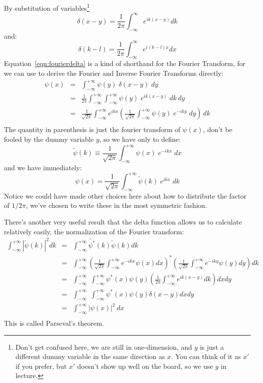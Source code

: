 \documentclass[12pt]{book}
\begin{document}
By substitution of variables\footnote{Don't get confused here, we are still in one-dimension, and $y$ is just a different dummy variable in the same direction as $x$.  You can think of it as $x'$ if you prefer, but $x'$ doesn't show up well on the board, so we use $y$ in lecture.}
$$
\delta(x-y) = \frac{1}{2\pi} \int_{-\infty}^{\infty} e^{ik(x-y)} dk
$$
and:
$$
\delta(k-l) = \frac{1}{2\pi} \int_{-\infty}^{\infty} e^{i(k-l)x} dx
$$
Equation~\ref{eqn:fourierdelta} is a kind of shorthand for the Fourier Transform, for we can use to derive the Fourier and Inverse Fourier Transforms directly:
\begin{eqnarray*}
\psi(x) &=& \int_{-\infty}^{+\infty} \psi(y) \; \delta(x-y) \; dy \\
&=& \frac{1}{2\pi}\int_{-\infty}^{+\infty} \int_{-\infty}^{+\infty} \psi(y) \; e^{ik(x-y)} \; dk \, dy \\
&=& \frac{1}{\sqrt{2\pi}}\int_{-\infty}^{+\infty} e^{ikx} 
 \left( \frac{1}{\sqrt{2\pi}} \int_{-\infty}^{+\infty} \psi(y) \; e^{-iky} \; dy \right) \, dk \\
\end{eqnarray*}
The quantity in parenthesis is just the fourier transform of $\psi(x)$, don't be fooled by the dummy variable $y$, so we have only to define:
$$\widetilde{\psi}(k) \equiv \frac{1}{\sqrt{2\pi}} \int_{-\infty}^{+\infty} \psi(x) \; e^{-ikx} \; dx $$
and we have immediately:
$$\psi(x) = \frac{1}{\sqrt{2\pi}} \int_{-\infty}^{+\infty} \widetilde{\psi}(k) \; e^{ikx} \; dk $$
Notice we could have made other choices here about how to distribute the factor of $1/2\pi$, we've chosen to write these in the most symmetric fashion.

There's another very useful result that the delta function allows us to calculate relatively easily, the normalization of the Fourier transform:
\begin{eqnarray*}
\int_{-\infty}^{+\infty} |\widetilde{\psi}(k)|^2 dk &=& \int_{-\infty}^{+\infty} \widetilde{\psi^*}(k) 
\widetilde{\psi}(k) dk\\
&=& \int_{-\infty}^{+\infty} 
\left( \frac{1}{\sqrt{2\pi}} \int_{-\infty}^{+\infty} e^{-ikx} \psi(x) dx \right)^* 
\left( \frac{1}{\sqrt{2\pi}} \int_{-\infty}^{+\infty} e^{-iky} \psi(y) dy \right)
dk\\
&=& \int_{-\infty}^{+\infty} \; \int_{-\infty}^{+\infty} 
\psi^*(x) \psi(y) \left( \frac{1}{2\pi} \int_{-\infty}^{+\infty} e^{ik(x-y)} dk \right) dx dy\\
&=& \int_{-\infty}^{+\infty} \; \int_{-\infty}^{+\infty} 
\psi^*(x) \psi(y) \delta(x-y) dx dy\\
&=& \int_{-\infty}^{+\infty} |\psi(x)|^2 \ dx\\
\end{eqnarray*}
This is called Parseval's theorem.
\end{document}
